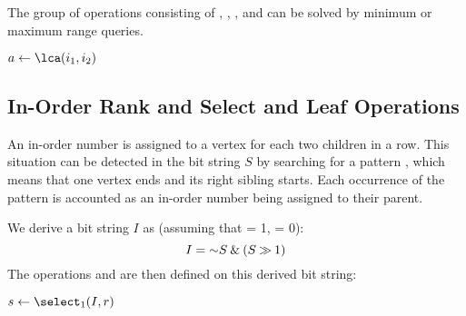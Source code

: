 The group of operations consisting of \lca, \distance, \deepestVertex, and \hei can be solved by minimum or maximum range queries.

\begin{algorithmic}
		\State {}
		\State {}
	\Else
		\State {}
	\EndIf
\EndFunction
\end{algorithmic}

\begin{algorithmic}
	\State $a \gets \lca(i_1, i_2)$
	\State {}
\EndFunction
\end{algorithmic}

\begin{algorithmic}
	\State {}
\EndFunction
\end{algorithmic}

\begin{algorithmic}
	\State {}
\EndFunction
\end{algorithmic}

\subsection{In-Order Rank and Select and Leaf Operations}

An in-order number is assigned to a vertex for each two children in a row.
This situation can be detected in the bit string $S$ by searching for a pattern \str{)(}, which means that one vertex ends and its right sibling starts.
Each occurrence of the pattern is accounted as an in-order number being assigned to their parent.

We derive a bit string $I$ as (assuming that \openingParen = 1, \closingParen = 0):
$$ I = \mathord{\sim} S \mathbin{\&} (S \mathbin{\gg} 1) $$
The operations \inRank{} and \inSelect{} are then defined on this derived bit string:

\begin{algorithmic}
	 
		\State {}
	\Else
		\State {}
	\EndIf
\EndFunction
\end{algorithmic}

\begin{algorithmic}
	\State $s \gets \select_1(I, r)$
	 
		\State {}
	\Else
		\State {}
	\EndIf
\EndFunction
\end{algorithmic}


